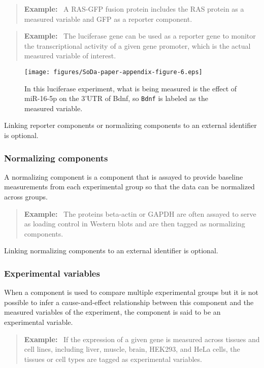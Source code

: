 \documentclass{bioinfo}
\newenvironment{example}
{\par\color{black}\begin{quote}\textbf{Example:}\ }
{\end{quote}\par}
\begin{document}
\begin{example}
    A RAS-GFP fusion protein includes the RAS protein as a measured variable and GFP as a reporter component.
\end{example}

\begin{example}
    The luciferase gene can be used as a reporter gene to monitor the transcriptional activity of a given gene promoter, which is the actual measured variable of interest.
\end{example}

\begin{figure*}
    \centering
    \texttt{[image: figures/SoDa-paper-appendix-figure-6.eps]}
    \caption{In this luciferase experiment, what is being measured is the effect of miR-16-5p on the 3'UTR of Bdnf, so \texttt{Bdnf} is labeled as the measured variable.}
    \label{fig:luciferase}
\end{figure*}

Linking reporter components or normalizing components to an external identifier is optional.

\subsubsection{Normalizing components}\label{app:normalizing-components}
A normalizing component is a component that is assayed to provide baseline measurements from each experimental group so that the data can be normalized across groups.

\begin{example}
    The proteins beta-actin or GAPDH are often assayed to serve as loading control in Western blots and are then tagged as normalizing components.
\end{example}

Linking normalizing components to an external identifier is optional.

\subsubsection{Experimental variables}\label{app:experimental-variables}
When a component is used to compare multiple experimental groups but it is not possible to infer a cause-and-effect relationship between this component and the measured variables of the experiment, the component is said to be an experimental variable.

\begin{example}
    If the expression of a given gene is measured across tissues and cell lines, including liver, muscle, brain, HEK293, and HeLa cells, the tissues or cell types are tagged as experimental variables.
\end{example}
\end{document}
